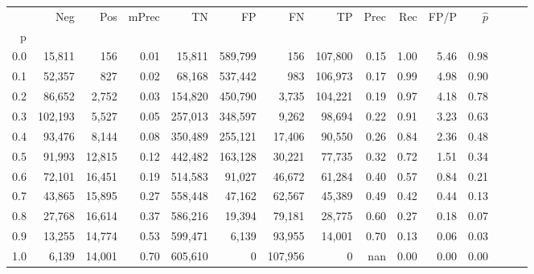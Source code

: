 \begin{tabular}{rrrrrrrrrrrrrrr}
\toprule
{} &      Neg &     Pos & mPrec &       TN &       FP &       FN &       TP &  Prec &   Rec &  FP/P & $\hat{p}$ \\
p   &          &         &       &          &          &          &          &       &       &       &           \\
\midrule
0.0 &   15,811 &     156 &  0.01 &   15,811 &  589,799 &      156 &  107,800 &  0.15 &  1.00 &  5.46 &      0.98 \\
0.1 &   52,357 &     827 &  0.02 &   68,168 &  537,442 &      983 &  106,973 &  0.17 &  0.99 &  4.98 &      0.90 \\
0.2 &   86,652 &   2,752 &  0.03 &  154,820 &  450,790 &    3,735 &  104,221 &  0.19 &  0.97 &  4.18 &      0.78 \\
0.3 &  102,193 &   5,527 &  0.05 &  257,013 &  348,597 &    9,262 &   98,694 &  0.22 &  0.91 &  3.23 &      0.63 \\
0.4 &   93,476 &   8,144 &  0.08 &  350,489 &  255,121 &   17,406 &   90,550 &  0.26 &  0.84 &  2.36 &      0.48 \\
0.5 &   91,993 &  12,815 &  0.12 &  442,482 &  163,128 &   30,221 &   77,735 &  0.32 &  0.72 &  1.51 &      0.34 \\
0.6 &   72,101 &  16,451 &  0.19 &  514,583 &   91,027 &   46,672 &   61,284 &  0.40 &  0.57 &  0.84 &      0.21 \\
0.7 &   43,865 &  15,895 &  0.27 &  558,448 &   47,162 &   62,567 &   45,389 &  0.49 &  0.42 &  0.44 &      0.13 \\
0.8 &   27,768 &  16,614 &  0.37 &  586,216 &   19,394 &   79,181 &   28,775 &  0.60 &  0.27 &  0.18 &      0.07 \\
0.9 &   13,255 &  14,774 &  0.53 &  599,471 &    6,139 &   93,955 &   14,001 &  0.70 &  0.13 &  0.06 &      0.03 \\
1.0 &    6,139 &  14,001 &  0.70 &  605,610 &        0 &  107,956 &        0 &   nan &  0.00 &  0.00 &      0.00 \\
\bottomrule
\end{tabular}
